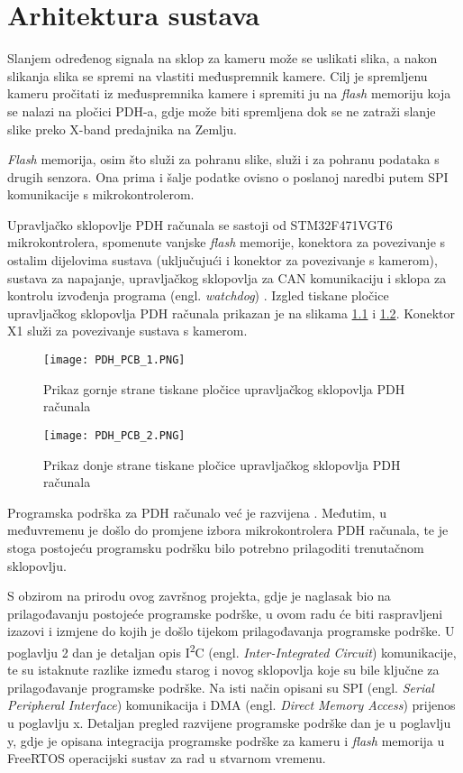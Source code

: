 \chapter{Arhitektura sustava}

Slanjem određenog signala na sklop za kameru može se uslikati slika, a nakon slikanja slika se spremi na vlastiti međuspremnik kamere. Cilj je spremljenu kameru pročitati iz međuspremnika kamere i spremiti ju na \textit{flash} memoriju koja se nalazi na pločici PDH-a, gdje može biti spremljena dok se ne zatraži slanje slike preko X-band predajnika na Zemlju.

\textit{Flash} memorija, osim što služi za pohranu slike, služi i za pohranu podataka s drugih senzora. Ona prima i šalje podatke ovisno o poslanoj naredbi putem SPI komunikacije s mikrokontrolerom.

Upravljačko sklopovlje PDH računala se sastoji od STM32F471VGT6 mikrokontrolera, spomenute vanjske \textit{flash} memorije, konektora za povezivanje s ostalim dijelovima sustava (uključujući i konektor za povezivanje s kamerom), sustava za napajanje, upravljačkog sklopovlja za CAN komunikaciju i sklopa za kontrolu izvođenja programa (engl. \textit{watchdog}) \cite{zavrsni_filip_juric}. Izgled tiskane pločice upravljačkog sklopovlja PDH računala prikazan je na slikama \ref{fig:PDH_PCB_1} i \ref{fig:PDH_PCB_2}. Konektor X1 služi za povezivanje sustava s kamerom.

\begin{figure}[H]
	\centering
	\texttt{[image: PDH\_PCB\_1.PNG]}
	\caption{Prikaz gornje strane tiskane pločice upravljačkog sklopovlja PDH računala \cite{zavrsni_filip_juric}}
	\label{fig:PDH_PCB_1}
\end{figure}

\begin{figure}[H]
	\centering
	\texttt{[image: PDH\_PCB\_2.PNG]}
	\caption{Prikaz donje strane tiskane pločice upravljačkog sklopovlja PDH računala \cite{zavrsni_filip_juric}}
	\label{fig:PDH_PCB_2}
\end{figure}

Programska podrška za PDH računalo već je razvijena \cite{diplomski_goran_petrak}. Međutim, u međuvremenu je došlo do promjene izbora mikrokontrolera PDH računala, te je stoga postojeću programsku podršku bilo potrebno prilagoditi trenutačnom sklopovlju.

S obzirom na prirodu ovog završnog projekta, gdje je naglasak bio na prilagođavanju postojeće programske podrške, u ovom radu će biti raspravljeni izazovi i izmjene do kojih je došlo tijekom prilagođavanja programske podrške. U poglavlju 2 dan je detaljan opis I\textsuperscript{2}C (engl. \textit{Inter-Integrated Circuit}) komunikacije, te su istaknute razlike između starog i novog sklopovlja koje su bile ključne za prilagođavanje programske podrške. Na isti način opisani su SPI (engl. \textit{Serial Peripheral Interface}) komunikacija i DMA (engl. \textit{Direct Memory Access}) prijenos u poglavlju x. Detaljan pregled razvijene programske podrške dan je u poglavlju y, gdje je opisana integracija programske podrške za kameru i \textit{flash} memorija u FreeRTOS operacijski sustav za rad u stvarnom vremenu.